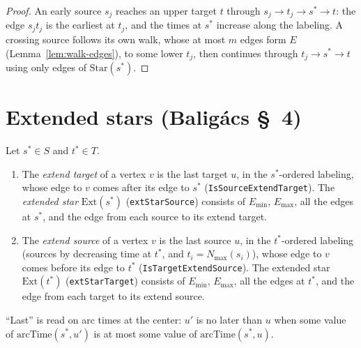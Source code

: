 \begin{proof}
  \leanok
  An early source $s_j$ reaches an upper target $t$ through
  $s_j \to t_j \to s^* \to t$: the edge $s_j t_j$ is the earliest at $t_j$, and
  the times at $s^*$ increase along the labeling. A crossing source follows its
  own walk, whose at most $m$ edges form $E$
  (Lemma~\ref{lem:walk-edges}), to some lower $t_j$, then continues through
  $t_j \to s^* \to t$ using only edges of $\mathrm{Star}(s^*)$.
\end{proof}

\section*{Extended stars (Baligács \S~4)}

\begin{definition}
  \label{def:extended-star}
  \leanok
  Let $s^* \in S$ and $t^* \in T$.
  \begin{enumerate}
  \item[(a)] The \emph{extend target} of a vertex $v$ is the last target $u$,
    in the $s^*$-ordered labeling, whose edge to $v$ comes after its edge to
    $s^*$ (\texttt{IsSourceExtendTarget}). The \emph{extended star}
    $\mathrm{Ext}(s^*)$ (\texttt{extStarSource}) consists of $E_{\min}$,
    $E_{\max}$, all the edges at $s^*$, and the edge from each source to its
    extend target.
  \item[(b)] The \emph{extend source} of a vertex $v$ is the last source $u$, in
    the $t^*$-ordered labeling (sources by decreasing time at $t^*$, and
    $t_i = N_{\max}(s_i)$), whose edge to $v$ comes before its edge to $t^*$
    (\texttt{IsTargetExtendSource}). The extended star $\mathrm{Ext}(t^*)$
    (\texttt{extStarTarget}) consists of $E_{\min}$, $E_{\max}$, all the edges at
    $t^*$, and the edge from each target to its extend source.
  \end{enumerate}
  ``Last'' is read on arc times at the center: $u'$ is no later than $u$ when
  some value of $\mathrm{arcTime}(s^*, u')$ is at most some value of
  $\mathrm{arcTime}(s^*, u)$.
\end{definition}

